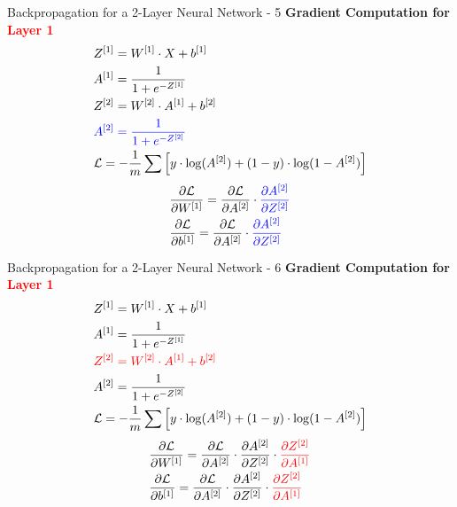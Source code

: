 \documentclass[aspectratio=169]{beamer}
\begin{document}
%
\begin{frame}{Backpropagation for a 2-Layer Neural Network - 5}
\textbf{Gradient Computation for \textcolor{red}{Layer 1}}
\begin{align*}
&Z^{[1]} = W^{[1]} \cdot X + b^{[1]}\\
&A^{[1]} = \frac{1}{1 + e^{-Z^{[1]}}}      \\
&Z^{[2]} = W^{[2]} \cdot A^{[1]} + b^{[2]} \\
&\textcolor{blue}{A^{[2]} = \frac{1}{1 + e^{-Z^{[2]}}}} \\
&\mathcal{L} = -\frac{1}{m} \sum \left[ y \cdot \log(A^{[2]}) + (1 - y) \cdot \log(1 - A^{[2]}) \right]
\end{align*}
\begin{align*}
&\frac{\partial \mathcal{L}}{\partial W^{[1]}} = \frac{\partial \mathcal{L}}{\partial A^{[2]}} \cdot \textcolor{blue}{\frac{\partial A^{[2]}}{\partial Z^{[2]}}}
\\
&\frac{\partial \mathcal{L}}{\partial b^{[1]}} = \frac{\partial \mathcal{L}}{\partial A^{[2]}} \cdot \textcolor{blue}{\frac{\partial A^{[2]}}{\partial Z^{[2]}}}  
\end{align*}
\end{frame}
%
%
\begin{frame}{Backpropagation for a 2-Layer Neural Network - 6}
\textbf{Gradient Computation for \textcolor{red}{Layer 1}}
\begin{align*}
&Z^{[1]} = W^{[1]} \cdot X + b^{[1]}\\
&A^{[1]} = \frac{1}{1 + e^{-Z^{[1]}}}      \\
&\textcolor{red}{Z^{[2]} = W^{[2]} \cdot A^{[1]} + b^{[2]}} \\
&A^{[2]} = \frac{1}{1 + e^{-Z^{[2]}}} \\
&\mathcal{L} = -\frac{1}{m} \sum \left[ y \cdot \log(A^{[2]}) + (1 - y) \cdot \log(1 - A^{[2]}) \right]
\end{align*}
\begin{align*}
&\frac{\partial \mathcal{L}}{\partial W^{[1]}} = \frac{\partial \mathcal{L}}{\partial A^{[2]}} \cdot \frac{\partial A^{[2]}}{\partial Z^{[2]}} \cdot \textcolor{red}{\frac{\partial Z^{[2]}}{\partial A^{[1]}}} 
\\
&\frac{\partial \mathcal{L}}{\partial b^{[1]}} = \frac{\partial \mathcal{L}}{\partial A^{[2]}} \cdot \frac{\partial A^{[2]}}{\partial Z^{[2]}} \cdot \textcolor{red}{\frac{\partial Z^{[2]}}{\partial A^{[1]}}}  
\end{align*}
\end{frame}
\end{document}
